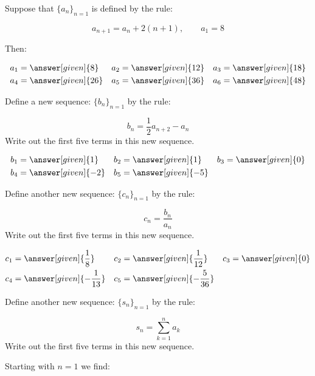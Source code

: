 \documentclass{ximera}
\author{Jim Talamo}
\begin{document}
\begin{exercise}

Suppose that $\{a_n\}_{n=1}$ is defined by the rule:

\[
 a_{n+1} = a_n+2(n+1) , \qquad a_1 = 8
\]

Then:

    \begin{align*}
       a_1 &= \answer[given]{8} & 
      a_2 &= \answer[given]{12} & 
      a_3 &= \answer[given]{18} \\
      a_4 &= \answer[given]{26} & 
      a_5 &= \answer[given]{36}  & 
      a_6 &= \answer[given]{48} 
    \end{align*}

\begin{exercise}
Define a new sequence: $\{b_n\}_{n=1}$ by the rule:

\[
b_n = \frac{1}{2}a_{n+2} - a_n
\]
Write out the first five terms in this new sequence.
    
     \begin{align*}
     	b_1 &=  \answer[given]{1}  & 
      	b_2 &=  \answer[given]{1}  & 
	b_3 &= \answer[given]{0}  \\ 
	b_4 &= \answer[given]{-2}  & 
	b_5 &=  \answer[given]{-5}  & 
    \end{align*}
    

    
\end{exercise}

\begin{exercise}
Define another new sequence: $\{c_n\}_{n=1}$ by the rule:

\[
c_n = \frac{b_n}{a_n} 
\]
Write out the first five terms in this new sequence.

     \begin{align*}
     	c_1 &=  \answer[given]{\frac{1}{8}}  & 
      	c_2 &=  \answer[given]{\frac{1}{12}}  & 
	c_3 &= \answer[given]{0}   \\ 
	c_4 &= \answer[given]{-\frac{1}{13}}   & 
	c_5 &= \answer[given]{-\frac{5}{36}}   & 
    \end{align*}
    

\end{exercise}

\begin{exercise}
Define another new sequence: $\{s_n\}_{n=1}$ by the rule:

\[
s_n = \sum_{k=1}^n a_k 
\]
Write out the first five terms in this new sequence.

Starting with $n=1$ we find:


\end{exercise}
\end{exercise}
\end{document}
